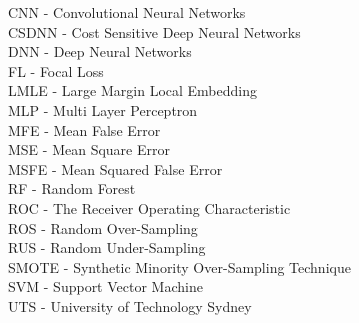 \begin{abbreviation}
\noindent CNN - Convolutional Neural Networks\\[0.1cm]
\noindent CSDNN - Cost Sensitive Deep Neural Networks\\[0.1cm]
\noindent DNN - Deep Neural Networks\\[0.1cm]
\noindent FL - Focal Loss\\[0.1cm]
\noindent LMLE - Large Margin Local Embedding\\[0.1cm]
\noindent MLP - Multi Layer Perceptron\\[0.1cm]
\noindent MFE - Mean False Error\\[0.1cm]
\noindent MSE - Mean Square Error\\[0.1cm]
\noindent MSFE - Mean Squared False Error\\[0.1cm]
\noindent RF - Random Forest\\[0.1cm]
\noindent ROC - The Receiver Operating Characteristic\\[0.1cm]
\noindent ROS - Random Over-Sampling\\[0.1cm]
\noindent RUS - Random Under-Sampling\\[0.1cm]
\noindent SMOTE - Synthetic Minority Over-Sampling Technique\\[0.1cm]
\noindent SVM - Support Vector Machine\\[0.1cm]
\noindent UTS - University of Technology Sydney\\[0.1cm] 

\end{abbreviation}


